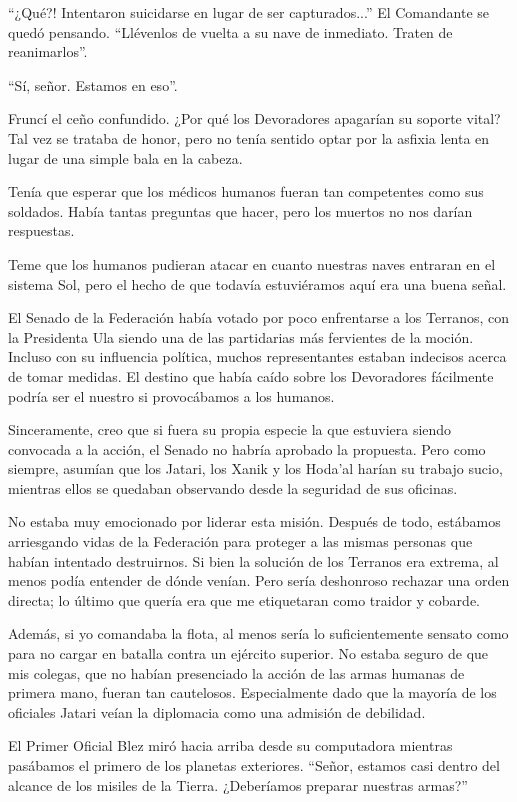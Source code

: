 \documentclass[spanish,12pt,a4paper,oneside,titlepage]{book}
\begin{document}
    ``¿Qué?! Intentaron suicidarse en lugar de ser capturados...'' El Comandante se quedó pensando. ``Llévenlos de vuelta a su nave de inmediato. Traten de reanimarlos''.

    ``Sí, señor. Estamos en eso''.

    Fruncí el ceño confundido. ¿Por qué los Devoradores apagarían su soporte vital? Tal vez se trataba de honor, pero no tenía sentido optar por la asfixia lenta en lugar de una simple bala en la cabeza.

    Tenía que esperar que los médicos humanos fueran tan competentes como sus soldados. Había tantas preguntas que hacer, pero los muertos no nos darían respuestas.

    Teme que los humanos pudieran atacar en cuanto nuestras naves entraran en el sistema Sol, pero el hecho de que todavía estuviéramos aquí era una buena señal.

    El Senado de la Federación había votado por poco enfrentarse a los Terranos, con la Presidenta Ula siendo una de las partidarias más fervientes de la moción. Incluso con su influencia política, muchos representantes estaban indecisos acerca de tomar medidas. El destino que había caído sobre los Devoradores fácilmente podría ser el nuestro si provocábamos a los humanos.

    Sinceramente, creo que si fuera su propia especie la que estuviera siendo convocada a la acción, el Senado no habría aprobado la propuesta. Pero como siempre, asumían que los Jatari, los Xanik y los Hoda’al harían su trabajo sucio, mientras ellos se quedaban observando desde la seguridad de sus oficinas.

    No estaba muy emocionado por liderar esta misión. Después de todo, estábamos arriesgando vidas de la Federación para proteger a las mismas personas que habían intentado destruirnos. Si bien la solución de los Terranos era extrema, al menos podía entender de dónde venían. Pero sería deshonroso rechazar una orden directa; lo último que quería era que me etiquetaran como traidor y cobarde.

    Además, si yo comandaba la flota, al menos sería lo suficientemente sensato como para no cargar en batalla contra un ejército superior. No estaba seguro de que mis colegas, que no habían presenciado la acción de las armas humanas de primera mano, fueran tan cautelosos. Especialmente dado que la mayoría de los oficiales Jatari veían la diplomacia como una admisión de debilidad.

    El Primer Oficial Blez miró hacia arriba desde su computadora mientras pasábamos el primero de los planetas exteriores. “Señor, estamos casi dentro del alcance de los misiles de la Tierra. ¿Deberíamos preparar nuestras armas?”
\end{document}
